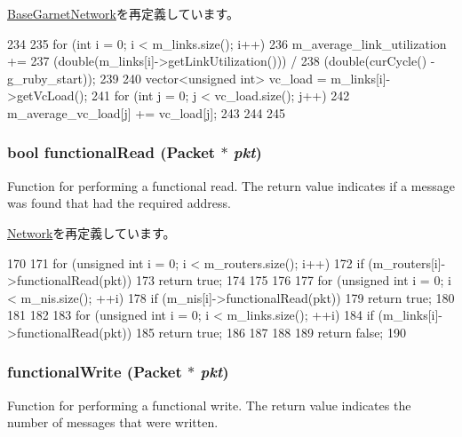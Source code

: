 \hyperlink{classBaseGarnetNetwork_ae3089fd60541650eefd9605c2c1abc68}{BaseGarnetNetwork}を再定義しています。


\begin{DoxyCode}
234 {
235     for (int i = 0; i < m_links.size(); i++) {
236         m_average_link_utilization +=
237             (double(m_links[i]->getLinkUtilization())) /
238             (double(curCycle() - g_ruby_start));
239 
240         vector<unsigned int> vc_load = m_links[i]->getVcLoad();
241         for (int j = 0; j < vc_load.size(); j++) {
242             m_average_vc_load[j] += vc_load[j];
243         }
244     }
245 }
\end{DoxyCode}
\hypertarget{classGarnetNetwork_a729f57f557bb42c045c47d9388f1030e}{
\subsubsection[{functionalRead}]{\setlength{\rightskip}{0pt plus 5cm}bool functionalRead ({\bf Packet} $\ast$ {\em pkt})}}
\label{classGarnetNetwork_a729f57f557bb42c045c47d9388f1030e}
Function for performing a functional read. The return value indicates if a message was found that had the required address. 

\hyperlink{classNetwork_a32ecdf2d815f1224a090f1d2b27b2c00}{Network}を再定義しています。


\begin{DoxyCode}
170 {
171     for (unsigned int i = 0; i < m_routers.size(); i++) {
172         if (m_routers[i]->functionalRead(pkt)) {
173             return true;
174         }
175     }
176 
177     for (unsigned int i = 0; i < m_nis.size(); ++i) {
178         if (m_nis[i]->functionalRead(pkt)) {
179             return true;
180         }
181     }
182 
183     for (unsigned int i = 0; i < m_links.size(); ++i) {
184         if (m_links[i]->functionalRead(pkt)) {
185             return true;
186         }
187     }
188 
189     return false;
190 }
\end{DoxyCode}
\hypertarget{classGarnetNetwork_ad07b9def1d6f5e5f988a254c3a9d1ad9}{
\subsubsection[{functionalWrite}]{ functionalWrite ({\bf Packet} $\ast$ {\em pkt})}}
\label{classGarnetNetwork_ad07b9def1d6f5e5f988a254c3a9d1ad9}
Function for performing a functional write. The return value indicates the number of messages that were written. 

